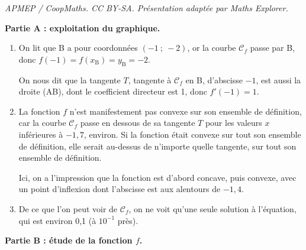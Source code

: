 \documentclass[10pt]{article}
\begin{document}
\noindent\textit{APMEP / CoopMaths. CC BY-SA. Présentation adaptée par Maths Explorer.}\par\medskip
\medskip

\textbf{Partie A : exploitation du graphique.}

\medskip

\begin{enumerate}
	\item On lit que B a pour coordonnées $(-1~;~-2)$, or la courbe $\mathcal{C}_f$ passe par B, donc $f(-1) = f(x_\mathrm{B}) = y_\mathrm{B} = -2$.

	On nous dit que la tangente $T$, tangente à $\mathcal{C}_f$ en B, d'abscisse $-1$, est aussi la droite (AB), dont le coefficient directeur est 1, donc $f'(-1) = 1$.

	\item La fonction $f$ n'est manifestement pas convexe sur son ensemble de définition, car la courbe $\mathcal{C}_f$ passe en dessous de sa tangente $T$ pour les valeurs $x$ inférieures à $- 1,7$, environ. Si la fonction était convexe sur tout son ensemble de définition, elle serait au-dessus de n'importe quelle tangente, sur tout son ensemble de définition.

Ici, on a l'impression que la fonction est d'abord concave, puis convexe, avec un point d'inflexion dont l'abscisse est aux alentours de $-1,4$.

	\item De ce que l'on peut voir de $\mathcal{C}_f$, on ne voit qu'une seule solution à l'équation, qui est environ 0,1 (à $10^{-1}$ près).
\end{enumerate}

\medskip

\textbf{Partie B : étude de la fonction $f$.}

\medskip
\end{document}
